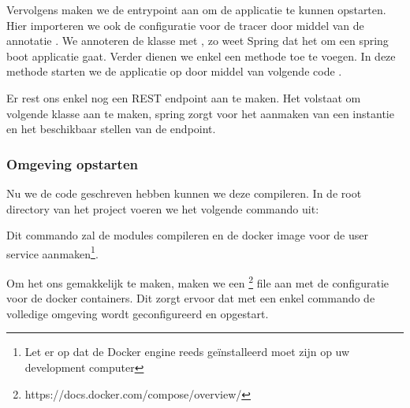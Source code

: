 
Vervolgens maken we de entrypoint aan om de applicatie te kunnen opstarten. Hier importeren we ook de configuratie voor de tracer door middel van de annotatie . We annoteren de klasse met , zo weet Spring dat het om een spring boot applicatie gaat. Verder dienen we enkel een  methode toe te voegen. In deze methode starten we de applicatie op door middel van volgende code .


Er rest ons enkel nog een REST endpoint aan te maken. Het volstaat om volgende klasse aan te maken, spring zorgt voor het aanmaken van een instantie en het beschikbaar stellen van de endpoint.


\subsubsection{Omgeving opstarten}
Nu we de code geschreven hebben kunnen we deze compileren. In de root directory van het project voeren we het volgende commando uit:
\begin{list}{}{}
	\item {}
\end{list}
Dit commando zal de modules compileren en de docker image voor de user service aanmaken\footnote{Let er op dat de Docker engine reeds geïnstalleerd moet zijn op uw development computer}.

Om het ons gemakkelijk te maken, maken we een \footnote{https://docs.docker.com/compose/overview/} file aan met de configuratie voor de docker containers. Dit zorgt ervoor dat met een enkel commando de volledige omgeving wordt geconfigureerd en opgestart.


